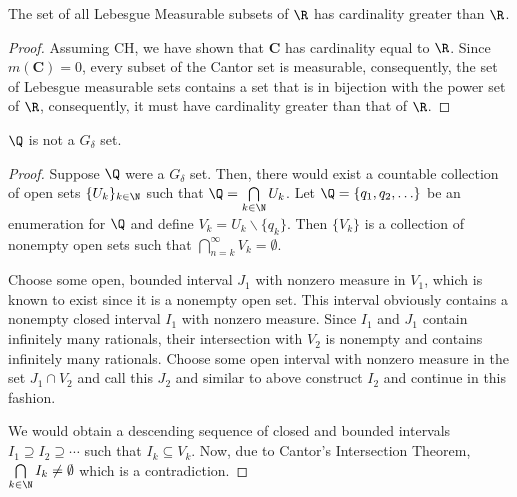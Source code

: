 \begin{theorem}
    The set of all Lebesgue Measurable subsets of $\R$ has cardinality greater than $\R$.
\end{theorem}
\begin{proof}
    Assuming \textsf{CH}, we have shown that $\mathbf C$ has cardinality equal to $\R$. Since $m(\mathbf C) = 0$, every subset of the Cantor set is measurable, consequently, the set of Lebesgue measurable sets contains a set that is in bijection with the power set of $\R$, consequently, it must have cardinality greater than that of $\R$.
\end{proof}

\begin{theorem}
    $\Q$ is not a $G_\delta$ set.
\end{theorem}
\begin{proof}
    Suppose $\Q$ were a $G_\delta$ set. Then, there would exist a countable collection of open sets $\{U_k\}_{k\in\N}$ such that $\Q = \bigcap\limits_{k\in\N} U_k$. Let $\Q = \{q_1,q_2,\ldots\}$ be an enumeration for $\Q$ and define $V_k = U_k\backslash\{q_k\}$. Then $\{V_k\}$ is a collection of nonempty open sets such that $\bigcap\limits_{n = k}^\infty V_k = \emptyset$.

    Choose some open, bounded interval $J_1$ with nonzero measure in $V_1$, which is known to exist since it is a nonempty open set. This interval obviously contains a nonempty closed interval $I_1$ with nonzero measure. Since $I_1$ and $J_1$ contain infinitely many rationals, their intersection with $V_2$ is nonempty and contains infinitely many rationals. Choose some open interval with nonzero measure in the set $J_1\cap V_2$ and call this $J_2$ and similar to above construct $I_2$ and continue in this fashion.

    We would obtain a descending sequence of closed and bounded intervals $I_1\supseteq I_2\supseteq\cdots$ such that $I_k\subseteq V_k$. Now, due to Cantor's Intersection Theorem, $\bigcap\limits_{k\in\N} I_k\ne\emptyset$ which is a contradiction.
\end{proof}